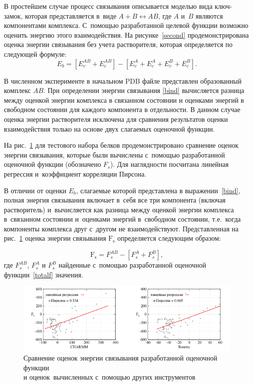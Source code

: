 В простейшем случае процесс связывания описывается моделью вида ключ-замок, которая представляется в~виде $A+B\leftrightarrow AB$, где $A$ и~$B$ являются компонентами комплекса. С~помощью разработанной целевой функции возможно оценить энергию этого взаимодействия. На рисунке~\ref{second} продемонстрирована оценка энергии связывания без учета растворителя, которая определяется по следующей формуле:
\begin{equation}
	E_{b}=\left[E_{v}^{AB} + E_{c}^{AB}\right] - \left[E_{v}^{A} + E_{c}^{A} + E_{v}^{B} + E_{c}^{B}\right].
	\label{bind}
\end{equation}

В численном эксперименте в начальном PDB файле представлен образованный комплекс $AB$. При определении энергии связывания \eqref{bind} вычисляется разница между оценкой энергии комплекса в связанном состоянии и оценками энергий в свободном состоянии для каждого компонента в отдельности. В данном случае оценка энергии растворителя исключена для сравнения результатов оценки взаимодействия только на основе двух слагаемых оценочной функции.

На рис.~\ref{third} для тестового набора белков продемонстрировано сравнение оценок энергии связывания, которые были вычислены с~помощью разработанной оценочной функции (обозначено $F_s$). Для наглядности посчитана линейная регрессия и~коэффициент корреляции Пирсона.

В отличии от оценки $E_{b}$, слагаемые которой представлена в выражении~\ref{bind}, полная энергия связывания включает в~себя все три компонента (включая растворитель) и~вычисляется как разница между оценкой энергии комплекса в~связанном состоянии и~оценками энергий в~свободном состоянии, т.е.~когда компоненты комплекса друг с~другом не взаимодействуют. Представленная на рис.~\ref{third} оценка энергии связывания $\text{F}_{\text{s}}$ определяется следующим образом:

\begin{equation}
	\text{F}_{\text{s}}=F_{s}^{AB} - \left[F_{s}^{A} + F_{s}^{B}\right],
	\label{binde}
\end{equation}
где $F_{s}^{AB}$, $F_{s}^{A}$ и $F_{s}^{B}$ найденные с~помощью разработанной оценочной функции~\ref{totalf} значения.

\begin{figure}[h!]
	\captionsetup{justification=centering}
	\centering
	\includegraphics[width=1.0\linewidth]{images/third.pdf}
	\caption{Сравнение оценок энергии связывания разработанной оценочной функции \\ и оценок~вычисленных с~помощью других инструментов}
	\label{third}
\end{figure}
